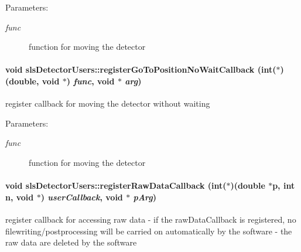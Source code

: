\begin{Desc}
\item[Parameters:]
\begin{description}
\item[{\em func}]function for moving the detector \end{description}
\end{Desc}
\hypertarget{classslsDetectorUsers_e807e9f4a015a4bbcb22e36b80577ea5}{
\paragraph[registerGoToPositionNoWaitCallback]{\setlength{\rightskip}{0pt plus 5cm}void sls\-Detector\-Users::register\-Go\-To\-Position\-No\-Wait\-Callback (int($\ast$)(double, void $\ast$) {\em func}, void $\ast$ {\em arg})}\hfill}
\label{classslsDetectorUsers_e807e9f4a015a4bbcb22e36b80577ea5}


register callback for moving the detector without waiting 

\begin{Desc}
\item[Parameters:]
\begin{description}
\item[{\em func}]function for moving the detector \end{description}
\end{Desc}
\hypertarget{classslsDetectorUsers_898cf0db148f0d3de7d4725cc8342c56}{
\paragraph[registerRawDataCallback]{\setlength{\rightskip}{0pt plus 5cm}void sls\-Detector\-Users::register\-Raw\-Data\-Callback (int($\ast$)(double $\ast$p, int n, void $\ast$) {\em user\-Callback}, void $\ast$ {\em p\-Arg})}\hfill}
\label{classslsDetectorUsers_898cf0db148f0d3de7d4725cc8342c56}


register callback for accessing raw data - if the raw\-Data\-Callback is registered, no filewriting/postprocessing will be carried on automatically by the software - the raw data are deleted by the software 

